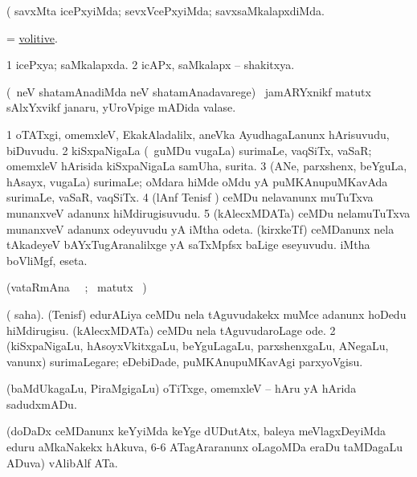 \noindent 
\gl{\pagu}
\expl{}
\bmng
  (  savxMta icePxyiMda; sevxVcePxyiMda; savxsaMkalapxdiMda. 
\emng
\eentry

\bentry
{} 
\gl{\gu}
\expl{}
\bmng
 = \hyperlink{volitive}{volitive}. 
\emng
\eentry

\bentry 
{} 
\gl{\gu}
\expl{}
\bmng
\bnum
\num{1} icePxya; saMkalapxda. 
\num{2} icAPx, saMkalapx -- shakitxya. 
\enum
\emng
\eentry

\bentry 
{} 
\gl{\nA}
\expl{\G}
\bmng
(\kirxsha\ neV shatamAnadiMda neV shatamAnadavarege) \kanmu\ jamARYxnikf matutx sAlxYxvikf janaru, yUroVpige mADida valase. 
\emng
\eentry

\bentry
{} 
\gl{\nA}
\bmng
\bnum
\num{1} oTATxgi, omemxleV, EkakAladalilx, aneVka AyudhagaLanunx hArisuvudu, biDuvudu. 
\num{2} kiSxpaNigaLa (\udA\ guMDu \mo vugaLa) surimaLe, vaqSiTx, vaSaR; omemxleV hArisida kiSxpaNigaLa samUha, surita. 
\num{3} (ANe, parxshenx, beYguLa, hAsayx, \mo vugaLa) surimaLe; oMdara hiMde oMdu yA puMKAnupuMKavAda surimaLe, vaSaR, vaqSiTx. 
\num{4} (lAnf Tenisf \mo) ceMDu nelavanunx muTuTxva munanxveV adanunx hiMdirugisuvudu. 
\num{5} (kAlecxMDATa) ceMDu nelamuTuTxva munanxveV adanunx odeyuvudu yA iMtha odeta. 
 (kirxkeTf) 
\banum
{} ceMDanunx nela tAkadeyeV bAYxTugAranalilxge yA saTxMpfsx baLige eseyuvudu. 
 iMtha boVliMgf, eseta. 
\eanum
\numie
\enum
\emng
\eentry

\bentry
{} 
\gl{\kirx} 
\bmng
(vataRmAna \parxpu\ \Eva\ ; \BU\ matutx \BUkaq\ )
\emng

\noindent
\gl{\sakirx}
\expl{}
\bmng
\bnum
{} ({\akirx} saha). 
\banum
{} (Tenisf) edurALiya ceMDu nela tAguvudakekx muMce adanunx hoDedu hiMdirugisu. 
 (kAlecxMDATa) ceMDu nela tAguvudaroLage ode. 
\eanum
\numie
\num{2} (kiSxpaNigaLu, hAsoyxVkitxgaLu, beYguLagaLu, parxshenxgaLu, ANegaLu, \mo vanunx) surimaLegare; eDebiDade, puMKAnupuMKavAgi parxyoVgisu. 
\enum
\emng

\noindent 
\gl{\akirx}
\expl{}
\bmng
 (baMdUkagaLu, PiraMgigaLu) oTiTxge, omemxleV -- hAru yA hArida sadudxmADu. 
\emng
\eentry

\bentry 
{} 
\gl{\nA}
\expl{}
\bmng
 (doDaDx ceMDanunx keYyiMda keYge dUDutAtx, baleya meVlagxDeyiMda eduru aMkaNakekx hAkuva, 6-6 ATagAraranunx oLagoMDa eraDu taMDagaLu ADuva) vAlibAlf ATa. 
\emng
\eentry

